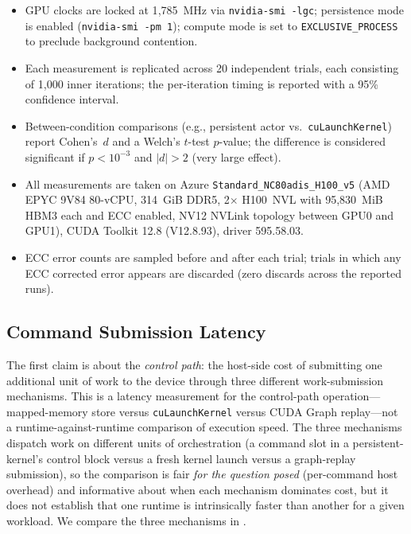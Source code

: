 \begin{itemize}
\item GPU clocks are locked at 1{,}785~MHz via
\texttt{nvidia-smi -lgc}; persistence mode is enabled
(\texttt{nvidia-smi -pm 1}); compute mode is set to
\texttt{EXCLUSIVE\_PROCESS} to preclude background contention.

\item Each measurement is replicated across 20 independent trials,
each consisting of 1{,}000 inner iterations; the per-iteration
timing is reported with a 95\% confidence interval.

\item Between-condition comparisons (e.g., persistent actor vs.\
\texttt{cuLaunchKernel}) report Cohen's~\(d\) and a Welch's
\(t\)-test \(p\)-value; the difference is considered significant if
\(p < 10^{-3}\) and \(|d| > 2\) (very large effect).

\item All measurements are taken on Azure
\texttt{Standard\_NC80adis\_H100\_v5} (AMD EPYC 9V84 80-vCPU,
314~GiB DDR5, 2\(\times\) H100~NVL with 95{,}830~MiB HBM3 each
and ECC enabled, NV12 NVLink topology between GPU0 and GPU1),
CUDA Toolkit
12.8 (V12.8.93), driver 595.58.03.

\item ECC error counts are sampled before and after each trial;
trials in which any ECC corrected error appears are discarded
(zero discards across the reported runs).
\end{itemize}

\subsection{Command Submission Latency}
\label{sec:eval:injection}

The first claim is about the \emph{control path}: the host-side
cost of submitting one additional unit of work to the device
through three different work-submission mechanisms.  This is a
latency measurement for the control-path operation—mapped-memory
store versus \texttt{cuLaunchKernel} versus CUDA Graph replay—not a
runtime-against-runtime comparison of execution speed.  The three
mechanisms dispatch work on different units of orchestration (a
command slot in a persistent-kernel's control block versus a fresh
kernel launch versus a graph-replay submission), so the comparison
is fair \emph{for the question posed} (per-command host overhead)
and informative about when each mechanism dominates cost, but it
does not establish that one runtime is intrinsically faster than
another for a given workload.  We compare the three mechanisms in
\Cref{tab:injection}.

